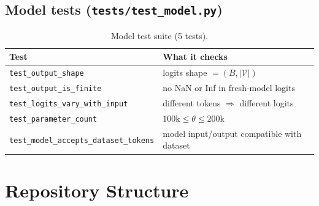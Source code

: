 \documentclass[11pt, a4paper]{article}
\begin{document}
\subsection{Model tests (\texttt{tests/test\_model.py})}

\begin{table}[H]
\centering
\begin{tabular}{@{}ll@{}}
\toprule
Test & What it checks \\
\midrule
\texttt{test\_output\_shape}              & logits shape $= (B, |\mathcal{V}|)$ \\
\texttt{test\_output\_is\_finite}         & no NaN or Inf in fresh-model logits \\
\texttt{test\_logits\_vary\_with\_input}  & different tokens $\Rightarrow$ different logits \\
\texttt{test\_parameter\_count}          & $100\text{k} \leq \theta \leq 200\text{k}$ \\
\texttt{test\_model\_accepts\_dataset\_tokens} & model input/output compatible with dataset \\
\bottomrule
\end{tabular}
\caption{Model test suite (5 tests).}
\end{table}

\section{Repository Structure}
\end{document}

